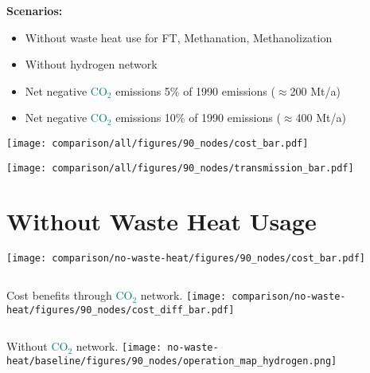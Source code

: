 \documentclass[12pt, aspectratio=169]{beamer}
\newcommand{\carbon}{\textcolor{teal}{CO$_2$}}
\begin{document}
\begin{frame}
    \textbf{Scenarios:}
    \begin{itemize}
        \item Without waste heat use for FT, Methanation, Methanolization
        \item Without hydrogen network
        \item Net negative \carbon{} emissions 5\% of 1990 emissions ($\approx$200 Mt/a)
        \item Net negative \carbon{} emissions 10\% of 1990 emissions ($\approx$400 Mt/a)
    \end{itemize}
\end{frame}


\begin{frame}
    \centering
    \texttt{[image: comparison/all/figures/90\_nodes/cost\_bar.pdf]}
\end{frame}

\begin{frame}
    \centering
    \texttt{[image: comparison/all/figures/90\_nodes/transmission\_bar.pdf]}
\end{frame}


\section*{Without Waste Heat Usage}

\begin{frame}
    \texttt{[image: comparison/no-waste-heat/figures/90\_nodes/cost\_bar.pdf]}
\end{frame}

\begin{frame}
    \begin{columns}
        Cost benefits through \carbon{} network.
        \texttt{[image: comparison/no-waste-heat/figures/90\_nodes/cost\_diff\_bar.pdf]}
    \end{columns}
\end{frame}



\begin{frame}
    \begin{center}
    Without \carbon{} network.
    \texttt{[image: no-waste-heat/baseline/figures/90\_nodes/operation\_map\_hydrogen.png]}
    \end{center}
\end{frame}
\end{document}

